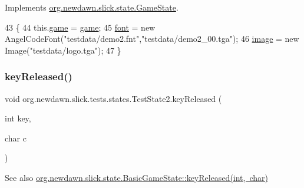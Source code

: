 Implements \mbox{\hyperlink{interfaceorg_1_1newdawn_1_1slick_1_1state_1_1_game_state_aa799a369e0fcfe6822d2d586fa6f5bbc}{org.\+newdawn.\+slick.\+state.\+Game\+State}}.


\begin{DoxyCode}
43                                                                                          \{
44         this.\mbox{\hyperlink{classorg_1_1newdawn_1_1slick_1_1tests_1_1states_1_1_test_state2_a76ea26ba609bd0c48b8690f2e797763a}{game}} = \mbox{\hyperlink{classorg_1_1newdawn_1_1slick_1_1tests_1_1states_1_1_test_state2_a76ea26ba609bd0c48b8690f2e797763a}{game}};
45         \mbox{\hyperlink{classorg_1_1newdawn_1_1slick_1_1tests_1_1states_1_1_test_state2_aa14db4ea7fb8de3229c7ff730c9022ca}{font}} = \textcolor{keyword}{new} AngelCodeFont(\textcolor{stringliteral}{"testdata/demo2.fnt"},\textcolor{stringliteral}{"testdata/demo2\_00.tga"});
46         \mbox{\hyperlink{classorg_1_1newdawn_1_1slick_1_1tests_1_1states_1_1_test_state2_a50fa0f90372b1d3884cbc771f56e6324}{image}} = \textcolor{keyword}{new} Image(\textcolor{stringliteral}{"testdata/logo.tga"});
47     \}
\end{DoxyCode}
\mbox{\label{classorg_1_1newdawn_1_1slick_1_1tests_1_1states_1_1_test_state2_a6aef9051f7b1fa3160df296bd37a6941}} 
\subsubsection{\texorpdfstring{key\+Released()}{keyReleased()}}
{\footnotesize\ttfamily void org.\+newdawn.\+slick.\+tests.\+states.\+Test\+State2.\+key\+Released (\begin{DoxyParamCaption}\item[{int}]{key,  }\item[{char}]{c }\end{DoxyParamCaption})\hspace{0.3cm}{\ttfamily [inline]}}

\begin{DoxySeeAlso}{See also}
\mbox{\hyperlink{classorg_1_1newdawn_1_1slick_1_1state_1_1_basic_game_state_ade382929c931cf15998df10559ae1f87}{org.\+newdawn.\+slick.\+state.\+Basic\+Game\+State\+::key\+Released(int, char)}} 
\end{DoxySeeAlso}


